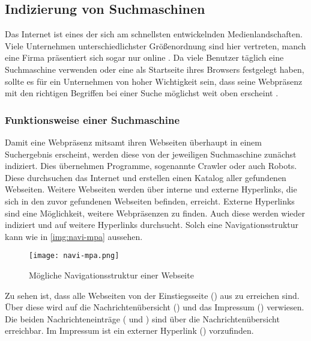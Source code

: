\subsection{Indizierung von Suchmaschinen}
\label{sec:seo}

Das Internet ist eines der sich am schnellsten entwickelnden Medienlandschaften. Viele Unternehmen unterschiedlichster Größenordnung sind hier vertreten, manch eine Firma präsentiert sich sogar nur online \cite[S. 29 f.]{EstherKessler2015}. Da viele Benutzer täglich eine Suchmaschine verwenden oder eine als Startseite ihres Browsers festgelegt haben, sollte es für ein Unternehmen von hoher Wichtigkeit sein, dass seine Webpräsenz mit den richtigen Begriffen bei einer Suche möglichst weit oben erscheint \cite[S. 147]{EstherKessler2015}.\\

\subsubsection{Funktionsweise einer Suchmaschine}
Damit eine Webpräsenz mitsamt ihren Webseiten überhaupt in einem Suchergebnis erscheint, werden diese von der jeweiligen Suchmaschine zunächst indiziert. Dies übernehmen Programme, sogenannte Crawler oder auch Robots. Diese durchsuchen das Internet und erstellen einen Katalog aller gefundenen Webseiten. Weitere Webseiten werden über interne und externe Hyperlinks, die sich in den zuvor gefundenen Webseiten befinden, erreicht. Externe Hyperlinks sind eine Möglichkeit, weitere Webpräsenzen zu finden. Auch diese werden wieder indiziert und auf weitere Hyperlinks durchsucht. Solch eine Navigationsstruktur kann wie in \autoref{img:navi-mpa} aussehen.

\begin{figure}[H]
	\begin{center}
		\texttt{[image: navi-mpa.png]}
		\caption{Mögliche Navigationsstruktur einer Webseite}
		\label{img:navi-mpa}
	\end{center}
\end{figure}

Zu sehen ist, dass alle Webseiten von der Einstiegsseite () aus zu erreichen sind. Über diese wird auf die Nachrichtenübersicht () und das Impressum () verwiesen. Die beiden Nachrichteneinträge ( und ) sind über die Nachrichtenübersicht erreichbar. Im Impressum ist ein externer Hyperlink () vorzufinden.

